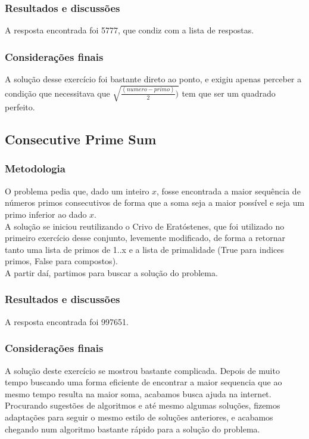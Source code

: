 \documentclass{article}
\begin{document}
        \subsubsection{Resultados e discussões}
        A resposta encontrada foi 5777, que condiz com a lista de respostas.
        
        \subsubsection{Considerações finais}
        A solução desse exercício foi bastante direto ao ponto, e exigiu apenas perceber a condição que necessitava que $\sqrt{\frac{(numero - primo)}{2})}$ tem que ser um quadrado perfeito.
        
    \subsection{Consecutive Prime Sum}
        
        \subsubsection{Metodologia}
        O problema pedia que, dado um inteiro $x$, fosse encontrada a maior sequência de números primos consecutivos de forma que a soma seja a maior possível e seja um primo inferior ao dado $x$.\\
        A solução se iniciou reutilizando o Crivo de Eratóstenes, que foi utilizado no primeiro exercício desse conjunto, levemente modificado, de forma a retornar tanto uma lista de primos de 1..x e a lista de primalidade (True para indices primos, False para compostos).\\
        A partir daí, partimos para buscar a solução do problema.
        
        \subsubsection{Resultados e discussões}
        A resposta encontrada foi 997651.
        
        \subsubsection{Considerações finais}
        A solução deste exercício se mostrou bastante complicada. Depois de muito tempo buscando uma forma eficiente de encontrar a maior sequencia que ao mesmo tempo resulta na maior soma, acabamos busca ajuda na internet.\\
        Procurando sugestões de algoritmos e até mesmo algumas soluções, fizemos adaptações para seguir o mesmo estilo de soluções anteriores, e acabamos chegando num algoritmo bastante rápido para a solução do problema.
\clearpage
\end{document}
